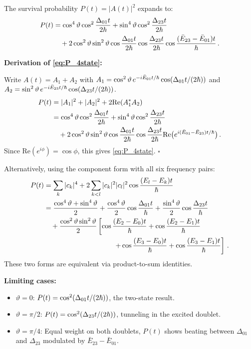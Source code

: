 The survival probability $P(t) = |A(t)|^2$ expands to:
\begin{align}\label{eq:P_4state}
  P(t) &= \cos^4\vartheta\cos^2\frac{\Delta_{01}t}{2\hbar}
  + \sin^4\vartheta\cos^2\frac{\Delta_{23}t}{2\hbar}\notag\\
  &\quad + 2\cos^2\vartheta\sin^2\vartheta\cos\frac{\Delta_{01}t}{2\hbar}\cos\frac{\Delta_{23}t}{2\hbar}
  \cos\frac{(\bar{E}_{23}-\bar{E}_{01})t}{\hbar}\,.
\end{align}

\textbf{Derivation of \cref{eq:P_4state}:}

Write $A(t) = A_1 + A_2$ with $A_1 = \cos^2\vartheta\,e^{-i\bar{E}_{01}t/\hbar}\cos(\Delta_{01}t/(2\hbar))$
and $A_2 = \sin^2\vartheta\,e^{-i\bar{E}_{23}t/\hbar}\cos(\Delta_{23}t/(2\hbar))$.
\begin{align}
  P(t) &= |A_1|^2 + |A_2|^2 + 2\text{Re}(A_1^*A_2)\notag\\
  &= \cos^4\vartheta\cos^2\frac{\Delta_{01}t}{2\hbar}
  + \sin^4\vartheta\cos^2\frac{\Delta_{23}t}{2\hbar}\notag\\
  &\quad + 2\cos^2\vartheta\sin^2\vartheta\cos\frac{\Delta_{01}t}{2\hbar}\cos\frac{\Delta_{23}t}{2\hbar}
  \text{Re}\bigl(e^{i(\bar{E}_{01}-\bar{E}_{23})t/\hbar}\bigr)\,.
\end{align}
Since $\text{Re}(e^{i\phi}) = \cos\phi$, this gives \cref{eq:P_4state}. $\square$

Alternatively, using the component form with all six frequency pairs:
\begin{align}
  P(t) &= \sum_k |c_k|^4 + 2\sum_{k<l}|c_k|^2|c_l|^2\cos\frac{(E_l-E_k)t}{\hbar}\notag\\
  &= \frac{\cos^4\vartheta + \sin^4\vartheta}{2}
  + \frac{\cos^4\vartheta}{2}\cos\frac{\Delta_{01}t}{\hbar}
  + \frac{\sin^4\vartheta}{2}\cos\frac{\Delta_{23}t}{\hbar}\notag\\
  &\quad + \frac{\cos^2\vartheta\sin^2\vartheta}{2}\left[
    \cos\frac{(E_2-E_0)t}{\hbar} + \cos\frac{(E_2-E_1)t}{\hbar}\right.\notag\\
  &\qquad\qquad\qquad\qquad\qquad\left.
    + \cos\frac{(E_3-E_0)t}{\hbar} + \cos\frac{(E_3-E_1)t}{\hbar}
  \right]\,.
\end{align}
These two forms are equivalent via product-to-sum identities.

\textbf{Limiting cases:}
\begin{itemize}
  \item $\vartheta = 0$: $P(t) = \cos^2(\Delta_{01}t/(2\hbar))$, the two-state result.
  \item $\vartheta = \pi/2$: $P(t) = \cos^2(\Delta_{23}t/(2\hbar))$, tunneling in the excited doublet.
  \item $\vartheta = \pi/4$: Equal weight on both doublets, $P(t)$ shows beating between
        $\Delta_{01}$ and $\Delta_{23}$ modulated by $\bar{E}_{23}-\bar{E}_{01}$.
\end{itemize}

